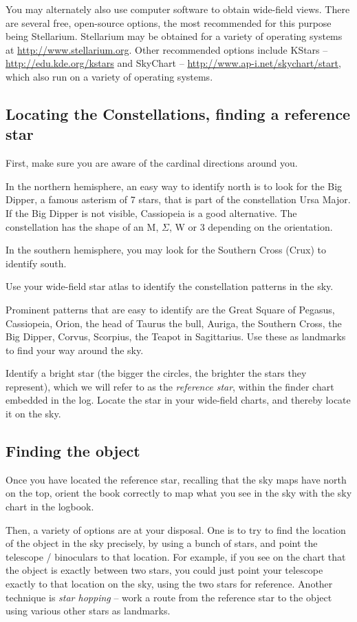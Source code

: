 You may alternately also use computer software to obtain wide-field
views. There are several free, open-source options, the most
recommended for this purpose being Stellarium. Stellarium may be
obtained for a variety of operating systems at
\url{http://www.stellarium.org}. Other recommended options include
KStars -- \url{http://edu.kde.org/kstars} and SkyChart --
\url{http://www.ap-i.net/skychart/start}, which also run on a variety
of operating systems.

\subsection{Locating the Constellations, finding a reference star}
First, make sure you are aware of the cardinal directions around
you. 

In the northern hemisphere, an easy way to identify north is to look
for the Big Dipper, a famous asterism of 7 stars, that is part of the
constellation Ursa Major. If the Big Dipper is not visible, Cassiopeia
is a good alternative. The constellation has the shape of an M,
$\Sigma$, W or 3 depending on the orientation.

In the southern hemisphere, you may look for the Southern Cross (Crux)
to identify south.

Use your wide-field star atlas to identify the constellation patterns
in the sky.

Prominent patterns that are easy to identify are the Great Square of
Pegasus, Cassiopeia, Orion, the head of Taurus the bull, Auriga, the
Southern Cross, the Big Dipper, Corvus, Scorpius, the Teapot in
Sagittarius. Use these as landmarks to find your way around the sky.

Identify a bright star (the bigger the circles, the brighter the stars
they represent), which we will refer to as the \emph{reference star},
within the finder chart embedded in the log. Locate the star in your
wide-field charts, and thereby locate it on the sky.

\subsection{Finding the object}

Once you have located the reference star, recalling that the sky maps
have north on the top, orient the book correctly to map what you see
in the sky with the sky chart in the logbook.

Then, a variety of options are at your disposal. One is to try to find
the location of the object in the sky precisely, by using a bunch of
stars, and point the telescope / binoculars to that location. For
example, if you see on the chart that the object is exactly between
two stars, you could just point your telescope exactly to that
location on the sky, using the two stars for reference. Another
technique is \emph{star hopping} -- work a route from the reference
star to the object using various other stars as landmarks.

